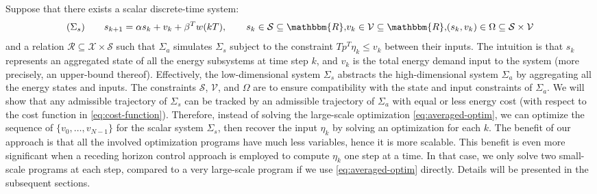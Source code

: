 Suppose that there exists a scalar discrete-time system:
\[ (\Sigma_s) \hspace{2em} s_{k + 1} = \alpha s_k + v_k + \beta^T w (kT),
   \hspace{2em} s_k \in \mathcal{S} \subseteq \mathbbm{R} \comma v_k \in
   \mathcal{V} \subseteq \mathbbm{R} \comma (s_k, v_k) \in \Omega \subseteq
   \mathcal{S} \times \mathcal{V} \]
and a relation $\mathcal{R} \subseteq \mathcal{X} \times \mathcal{S}$ such
that $\Sigma_a$ simulates $\Sigma_s$ subject to the constraint $T p^T \eta_k
\leqslant v_k$ between their inputs. The intuition is that $s_k$ represents an
aggregated state of all the energy subsystems at time step $k$, and $v_k$ is
the total energy demand input to the system (more precisely, an upper-bound
thereof). Effectively, the low-dimensional system $\Sigma_s$ abstracts the
high-dimensional system $\Sigma_a$ by aggregating all the energy states and
inputs. The constraints $\mathcal{S}$, $\mathcal{V}$, and $\Omega$ are to
ensure compatibility with the state and input constraints of $\Sigma_a$. We
will show that any admissible trajectory of $\Sigma_s$ can be tracked by an
admissible trajectory of $\Sigma_a$ with equal or less energy cost (with
respect to the cost function in \eqref{eq:cost-function}). Therefore, instead
of solving the large-scale optimization \eqref{eq:averaged-optim}, we can
optimize the sequence of $\{ v_0, \ldots, v_{N - 1} \}$ for the scalar system
$\Sigma_s$, then recover the input $\eta_k$ by solving an optimization for
each $k$. The benefit of our approach is that all the involved optimization
programs have much less variables, hence it is more scalable. This benefit is
even more significant when a receding horizon control approach is employed to
compute $\eta_k$ one step at a time. In that case, we only solve two
small-scale programs at each step, compared to a very large-scale program if
we use \eqref{eq:averaged-optim} directly. 
Details will be presented in the subsequent sections.

